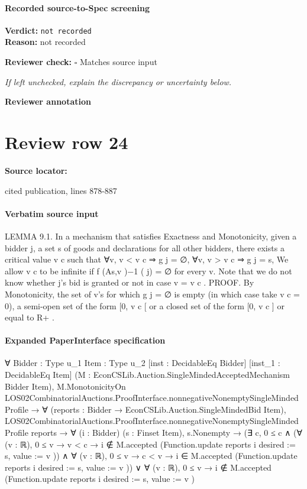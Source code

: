 \documentclass[10pt]{article}
\newcommand{\reviewerbox}{%
  \par\noindent\fbox{\parbox{0.96\linewidth}{\rule{0pt}{0.38in}}}\par
}
\newcommand{\reviewmatch}[1]{%
  \par\noindent\textbf{Reviewer check:} $\square$\; #1\par
  \noindent\emph{If left unchecked, explain the discrepancy or uncertainty below.}\par
}
\begin{document}
\paragraph{Recorded source-to-Spec screening}
\textbf{Verdict:} \texttt{not recorded}
\\
\textbf{Reason:} not recorded
\reviewmatch{Matches source input}
\noindent\textbf{Reviewer annotation}\par
\reviewerbox
\clearpage
\hypertarget{source-claim-ee3b560e8675a1c5}{}
\section*{Review row 24}
\textbf{Source locator:} {\footnotesize\raggedright cited publication, lines 878-\allowbreak{}887\par}
\paragraph{Verbatim source input}
\begin{ReviewVerbatim}
LEMMA 9.1. In a mechanism that satisfies Exactness and Monotonicity, given
a bidder j, a set s of goods and declarations for all other bidders, there exists a
critical value v c such that
∀v, v < v c ⇒ g j = ∅,
∀v, v > v c ⇒ g j = s,
We allow v c to be infinite if f (As,v )−1 ( j) = ∅ for every v. Note that we do not
know whether j’s bid is granted or not in case v = v c .
PROOF. By Monotonicity, the set of v’s for which g j = ∅ is empty (in which
case take v c = 0), a semi-open set of the form [0, v c [ or a closed set of the form
[0, v c ] or equal to R+ .
\end{ReviewVerbatim}


\paragraph{Expanded PaperInterface specification}
\begin{ReviewVerbatim}
∀ {Bidder : Type u_1} {Item : Type u_2} [inst : DecidableEq Bidder] [inst_1 : DecidableEq Item]
  (M : EconCSLib.Auction.SingleMindedAcceptedMechanism Bidder Item),
  M.MonotonicityOn LOS02CombinatorialAuctions.ProofInterface.nonnegativeNonemptySingleMindedProfile →
    ∀ (reports : Bidder → EconCSLib.Auction.SingleMindedBid Item),
      LOS02CombinatorialAuctions.ProofInterface.nonnegativeNonemptySingleMindedProfile reports →
        ∀ (i : Bidder) (s : Finset Item),
          s.Nonempty →
            (∃ c,
                0 ≤ c ∧
                  (∀ (v : ℝ), 0 ≤ v → v < c → i ∉ M.accepted (Function.update reports i { desired := s, value := v })) ∧
                    ∀ (v : ℝ),
                      0 ≤ v → c < v → i ∈ M.accepted (Function.update reports i { desired := s, value := v })) ∨
              ∀ (v : ℝ), 0 ≤ v → i ∉ M.accepted (Function.update reports i { desired := s, value := v })
\end{ReviewVerbatim}
\end{document}
